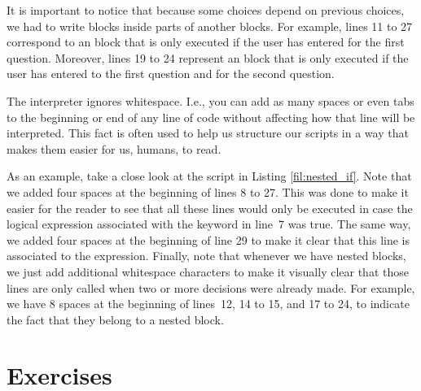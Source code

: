 It is important to notice that because some choices depend on previous choices, we had to write  blocks inside parts of another  blocks. For example, lines 11 to 27 correspond to an  block that is only executed if the user has entered  for the first question. Moreover, lines 19 to 24 represent an  block that is only executed if the user has entered  to the first question and  for the second question.
\vspace{5cm}
\begin{my_box}
\label{box:importance_indentation}
The  interpreter ignores whitespace. I.e., you can add as many spaces or even tabs to the beginning or end of any line of code without affecting how that line will be interpreted. This fact is often used to help us structure our scripts in a way that makes them easier for us, humans, to read. 

As an example,  take a close look at the script in Listing \ref{fil:nested_if}. Note that we added four spaces at the beginning of lines 8 to 27. This was done to make it easier for the reader to see that all these lines would only be executed in case the logical expression associated with the  keyword in line~7 was true. The same way, we added four spaces at the beginning of line 29 to make it clear that this line is associated to the  expression. Finally, note that whenever we have nested  blocks, we just add additional whitespace characters to make it visually clear that those lines are only called when two or more decisions were already made. For example, we have 8 spaces at the beginning of lines~12, 14 to 15, and 17 to 24, to indicate the fact that they belong to a nested  block. 
\end{my_box}


\section*{Exercises}

